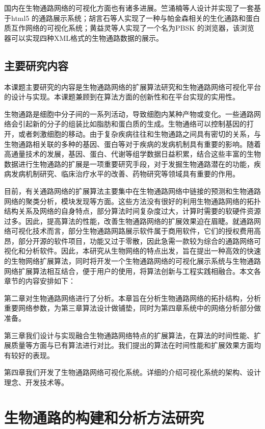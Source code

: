 国内在生物通路网络的可视化方面也有诸多进展。竺涌楠\cite{zhu2015}等人设计并实现了一套基于html5 的通路展示系统；胡言石\cite{huyanshi}等人实现了一种与帕金森相关的生化通路和蛋白质互作网络的可视化系统；黄益灵\cite{huang2011PBSK}等人实现了一个名为PBSK 的浏览器，该浏览器可以实现四种XML格式的生物通路数据的展示。

\section{主要研究内容}
本课题主要研究的内容是生物通路网络的扩展算法研究和生物通路网络可视化平台的设计与实现。本课题兼顾到在算法方面的创新性和在平台实现的实用性。

生物通路是细胞中分子间的一系列活动，导致细胞内某种产物或变化。一些通路网络会引起新的分子的组装比如脂肪和蛋白质的生成。生物通络可以控制基因的打开，或者刺激细胞的移动。由于复杂疾病往往和生物通路之间具有密切的关系，与生物通路相关联的多种的基因、蛋白等对于疾病的发病机制具有重要的影响。随着高通量技术的发展，基因、蛋白、代谢等组学数据日益积累，结合这些丰富的生物数据进行生物通路的扩展是一项重要研究手段，对于发掘生物通路潜在的功能，疾病发病机制研究、临床治疗水平的改善、药物研究等领域具有重要的作用。

目前，有关通路网络的扩展算法主要集中在生物通路网络中链接的预测和生物通路网络的聚类分析，模块发现等方面。这些方法没有很好的利用生物通路网络的拓扑结构关系及网络的自身特点，部分算法时间复杂度过大，计算时需要的软硬件资源过多。因此，提高算法的性能，改善生物通路网络的扩展效果迫在眉睫。就通路网络可视化技术而言，部分生物通路网路展示软件属于商用软件，它们的授权费用高昂，部分开源的软件项目，功能又过于零散，因此急需一款较为综合的通路网络可视化和分析软件。因此，本研究从生物网络的特点出发，旨在提出一种高效的快速的生物网络扩展算法，同时将开发一个生物通路网络的可视化展示系统与生物通路网络扩展算法相互结合，便于用户的使用，将算法创新与工程实践相融合。本文各章节的内容安排如下：

第二章对生物通路网络进行了分析。本章旨在分析生物通路网络的拓扑结构，分析重要网络参数，为第三章算法设计做铺垫，同时为第四章系统中的网络分析部分做准备。

第三章我们设计与实现融合生物通路网络特点的扩展算法，在算法的时间性能、扩展质量等方面与已有算法进行对比。我们提出的算法在时间性能和扩展效果方面均有较好的表现。

第四章我们开发了生物通路网络可视化系统。详细的介绍可视化系统的架构、设计理念、开发技术等。


\chapter{生物通路的构建和分析方法研究}
